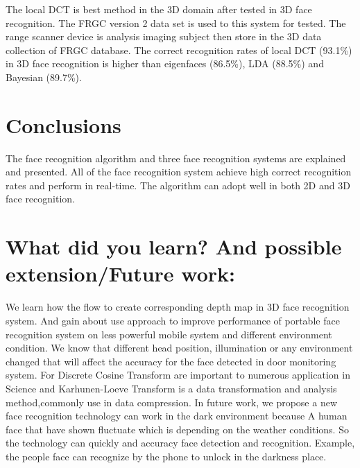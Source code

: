 \documentclass[a4paper,12pt]{article}
\begin{document}
The local DCT is best method in the 3D domain after tested in 3D face recognition.  The FRGC version 2 data set is used to this system for tested. The range scanner device is analysis imaging subject then store in the 3D data collection of FRGC database. The correct recognition rates of local DCT (93.1\%) in 3D face recognition is higher than eigenfaces (86.5\%), LDA (88.5\%) and Bayesian (89.7\%). \\

\section{Conclusions}

The face recognition algorithm and three face recognition systems are explained and presented. All of the face recognition system achieve high correct recognition rates and perform in real-time. The algorithm can adopt well in both 2D and 3D face recognition.\\


\section{What did you learn? And possible extension/Future work:} 

We learn how the flow to create corresponding depth map in 3D face recognition system. And gain about use approach to improve performance of portable face recognition system on less powerful mobile system and different environment condition. We know that different head position, illumination or any environment changed that will affect the accuracy for the face detected in door monitoring system. For Discrete Cosine Transform are important to numerous application in Science and Karhunen-Loeve Transform is a data transformation and analysis method,commonly use in data compression. In future work, we propose a new face recognition technology can work in the dark environment because A human face that have shown fluctuate which is depending on the weather conditions. So the technology can quickly and accuracy face detection and recognition. Example, the people face can recognize by the phone to unlock in the darkness place.\\

{}
\end{document}
